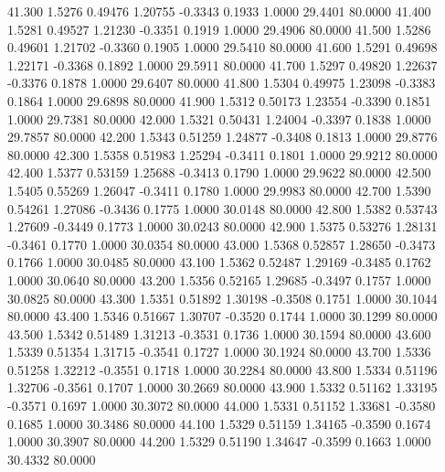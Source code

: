   41.300   1.5276   0.49476   1.20755  -0.3343   0.1933   1.0000  29.4401  80.0000
  41.400   1.5281   0.49527   1.21230  -0.3351   0.1919   1.0000  29.4906  80.0000
  41.500   1.5286   0.49601   1.21702  -0.3360   0.1905   1.0000  29.5410  80.0000
  41.600   1.5291   0.49698   1.22171  -0.3368   0.1892   1.0000  29.5911  80.0000
  41.700   1.5297   0.49820   1.22637  -0.3376   0.1878   1.0000  29.6407  80.0000
  41.800   1.5304   0.49975   1.23098  -0.3383   0.1864   1.0000  29.6898  80.0000
  41.900   1.5312   0.50173   1.23554  -0.3390   0.1851   1.0000  29.7381  80.0000
  42.000   1.5321   0.50431   1.24004  -0.3397   0.1838   1.0000  29.7857  80.0000
  42.200   1.5343   0.51259   1.24877  -0.3408   0.1813   1.0000  29.8776  80.0000
  42.300   1.5358   0.51983   1.25294  -0.3411   0.1801   1.0000  29.9212  80.0000
  42.400   1.5377   0.53159   1.25688  -0.3413   0.1790   1.0000  29.9622  80.0000
  42.500   1.5405   0.55269   1.26047  -0.3411   0.1780   1.0000  29.9983  80.0000
  42.700   1.5390   0.54261   1.27086  -0.3436   0.1775   1.0000  30.0148  80.0000
  42.800   1.5382   0.53743   1.27609  -0.3449   0.1773   1.0000  30.0243  80.0000
  42.900   1.5375   0.53276   1.28131  -0.3461   0.1770   1.0000  30.0354  80.0000
  43.000   1.5368   0.52857   1.28650  -0.3473   0.1766   1.0000  30.0485  80.0000
  43.100   1.5362   0.52487   1.29169  -0.3485   0.1762   1.0000  30.0640  80.0000
  43.200   1.5356   0.52165   1.29685  -0.3497   0.1757   1.0000  30.0825  80.0000
  43.300   1.5351   0.51892   1.30198  -0.3508   0.1751   1.0000  30.1044  80.0000
  43.400   1.5346   0.51667   1.30707  -0.3520   0.1744   1.0000  30.1299  80.0000
  43.500   1.5342   0.51489   1.31213  -0.3531   0.1736   1.0000  30.1594  80.0000
  43.600   1.5339   0.51354   1.31715  -0.3541   0.1727   1.0000  30.1924  80.0000
  43.700   1.5336   0.51258   1.32212  -0.3551   0.1718   1.0000  30.2284  80.0000
  43.800   1.5334   0.51196   1.32706  -0.3561   0.1707   1.0000  30.2669  80.0000
  43.900   1.5332   0.51162   1.33195  -0.3571   0.1697   1.0000  30.3072  80.0000
  44.000   1.5331   0.51152   1.33681  -0.3580   0.1685   1.0000  30.3486  80.0000
  44.100   1.5329   0.51159   1.34165  -0.3590   0.1674   1.0000  30.3907  80.0000
  44.200   1.5329   0.51190   1.34647  -0.3599   0.1663   1.0000  30.4332  80.0000
